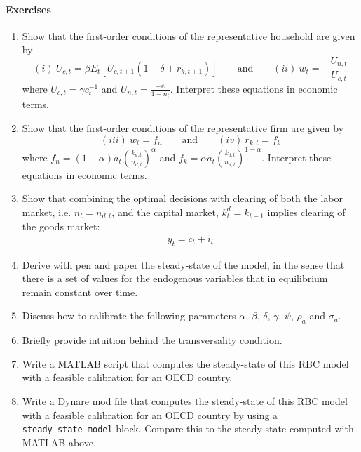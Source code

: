 \paragraph{Exercises}
\begin{enumerate}
\item Show that the first-order conditions of the representative household are given by
\begin{equation*}
(i)~ U_{c,t} = \beta E_t\left[U_{c,t+1} \left(1-\delta + r_{k,t+1}\right)\right] \qquad \text{and} \qquad
(ii)~ w_t = -\frac{U_{n,t}}{U_{c,t}}
\end{equation*}
where $U_{c,t} = \gamma c_t^{-1}$ and $U_{n,t} = \frac{-\psi}{1-n_t}$.
Interpret these equations in economic terms.

\item Show that the first-order conditions of the representative firm are given by
\begin{equation*}
(iii)~ w_t = f_n \qquad \text{and} \qquad
(iv)~ r_{k,t} = f_k
\end{equation*}
where $f_n = (1-\alpha) a_t \left(\frac{k_{d,t}}{n_{d,t}}\right)^\alpha$ and $f_k = \alpha a_t \left(\frac{k_{d,t}}{n_{d,t}}\right)^{1-\alpha}$.
Interpret these equations in economic terms.

\item Show that combining the optimal decisions with clearing of both the labor market, i.e. $n_t = n_{d,t}$, and the capital market, $k^d_t = k_{t-1}$ implies clearing of the goods market:
\begin{align*}
y_t = c_t + i_t
\end{align*}  

\item Derive with pen and paper the steady-state of the model, in the sense that there is a set of values for the endogenous variables that in equilibrium remain constant over time.

\item Discuss how to calibrate the following parameters $\alpha$, $\beta$, $\delta$, $\gamma$, $\psi$, $\rho_a$ and $\sigma_a$.

\item Briefly provide intuition behind the transversality condition.

\item Write a MATLAB script that computes the steady-state of this RBC model with a feasible calibration for an OECD country.

\item Write a Dynare mod file that computes the steady-state of this RBC model with a feasible calibration for an OECD country by using a \texttt{steady\_state\_model} block.
  Compare this to the steady-state computed with MATLAB above.


\end{enumerate}
